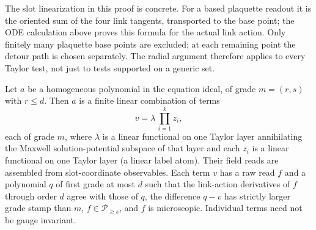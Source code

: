 The slot linearization in this proof is concrete. For a based plaquette
readout it is the oriented sum of the four link tangents, transported to
the base point; the ODE calculation above proves this formula for the
actual link action. Only finitely many plaquette base points are excluded;
at each remaining point the detour path is chosen separately. The radial
argument therefore applies to every Taylor test, not just
to tests supported on a generic set.

\begin{lemma}\label{lem:marked-factor-read}
Let $a$ be a homogeneous polynomial in the equation ideal, of grade
$m=(r,s)$ with $r\leq d$. Then $a$ is a finite linear combination of
terms
\[
                    v=\lambda\,\prod_{i=1}^k z_i,
\]
each of grade $m$, where $\lambda$ is a linear functional on one Taylor
layer annihilating the Maxwell solution-potential subspace of that layer
and each $z_i$ is a linear functional on one Taylor layer (a linear label
atom). Their field reads are assembled from slot-coordinate
observables. Each term $v$ has a raw read $f$ and a polynomial $q$ of
first grade at most $d$ such that the link-action derivatives of $f$
through order $d$ agree with those of $q$, the difference $q-v$ has
strictly larger grade stamp than $m$, $f\in\mathcal P_{\geq s}$, and
$f$ is microscopic. Individual terms need not be gauge invariant.
\end{lemma}
